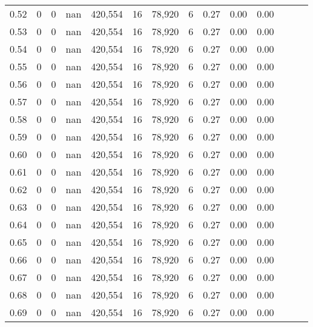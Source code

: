 \begin{tabular}{rrrrrrrrrrrrrr}
0.52 &       0 &      0 &   nan &  420,554 &       16 &  78,920 &       6 &  0.27 &  0.00 &      0.00 \\
0.53 &       0 &      0 &   nan &  420,554 &       16 &  78,920 &       6 &  0.27 &  0.00 &      0.00 \\
0.54 &       0 &      0 &   nan &  420,554 &       16 &  78,920 &       6 &  0.27 &  0.00 &      0.00 \\
0.55 &       0 &      0 &   nan &  420,554 &       16 &  78,920 &       6 &  0.27 &  0.00 &      0.00 \\
0.56 &       0 &      0 &   nan &  420,554 &       16 &  78,920 &       6 &  0.27 &  0.00 &      0.00 \\
0.57 &       0 &      0 &   nan &  420,554 &       16 &  78,920 &       6 &  0.27 &  0.00 &      0.00 \\
0.58 &       0 &      0 &   nan &  420,554 &       16 &  78,920 &       6 &  0.27 &  0.00 &      0.00 \\
0.59 &       0 &      0 &   nan &  420,554 &       16 &  78,920 &       6 &  0.27 &  0.00 &      0.00 \\
0.60 &       0 &      0 &   nan &  420,554 &       16 &  78,920 &       6 &  0.27 &  0.00 &      0.00 \\
0.61 &       0 &      0 &   nan &  420,554 &       16 &  78,920 &       6 &  0.27 &  0.00 &      0.00 \\
0.62 &       0 &      0 &   nan &  420,554 &       16 &  78,920 &       6 &  0.27 &  0.00 &      0.00 \\
0.63 &       0 &      0 &   nan &  420,554 &       16 &  78,920 &       6 &  0.27 &  0.00 &      0.00 \\
0.64 &       0 &      0 &   nan &  420,554 &       16 &  78,920 &       6 &  0.27 &  0.00 &      0.00 \\
0.65 &       0 &      0 &   nan &  420,554 &       16 &  78,920 &       6 &  0.27 &  0.00 &      0.00 \\
0.66 &       0 &      0 &   nan &  420,554 &       16 &  78,920 &       6 &  0.27 &  0.00 &      0.00 \\
0.67 &       0 &      0 &   nan &  420,554 &       16 &  78,920 &       6 &  0.27 &  0.00 &      0.00 \\
0.68 &       0 &      0 &   nan &  420,554 &       16 &  78,920 &       6 &  0.27 &  0.00 &      0.00 \\
0.69 &       0 &      0 &   nan &  420,554 &       16 &  78,920 &       6 &  0.27 &  0.00 &      0.00 \\

\end{tabular}
